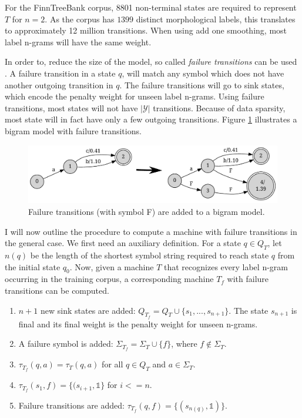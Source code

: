 For the FinnTreeBank corpus, 8801 non-terminal states are required to
represent $T$ for $n=2$. As the corpus has $1399$ distinct
morphological labels, this translates to approximately 12 million
transitions. When using add one smoothing, most label n-grams will
have the same weight.

In order to, reduce the size of the model, so called {\it failure
  transitions} can be used \citep{someone}. A failure transition in a
state $q$, will match any symbol which does not have another outgoing
transition in $q$. The failure transitions will go to sink states,
which encode the penalty weight for unseen label n-grams.  Using
failure transitions, most states will not have $|\mathcal{Y}|$
transitions. Because of data sparsity, most state will in fact have
only a few outgoing transitions. Figure \ref{fig:fail_t} illustrates a
bigram model with failure transitions.

\begin{figure}
\begin{center}
\includegraphics[scale=0.5]{fail_t}
\caption{Failure transitions (with symbol F) are added to a bigram model.}\label{fig:fail_t}
\end{center}
\end{figure}

I will now outline the procedure to compute a machine with failure
transitions in the general case. We first need an auxiliary
definition. For a state $q \in Q_T$, let $n(q)$ be the length of the
shortest symbol string required to reach state $q$ from the initial
state $q_0$.  Now, given a machine $T$ that recognizes every label
n-gram occurring in the training corpus, a corresponding machine $T_f$
with failure transitions can be computed.

\begin{enumerate}
\item $n+1$ new sink states are added: $Q_{T_f} = Q_T \cup \{s_1, ...,
  s_{n+1}\}$. The state $s_{n+1}$ is final and its final weight is the
  penalty weight for unseen n-grams.
\item A failure symbol is added: $\Sigma_{T_f} = \Sigma_T \cup \{f\}$, where $f \notin \Sigma_T$.
\item $\tau_{T_f}(q,a) = \tau_T(q,a)$ for all $q \in Q_T$ and $a \in \Sigma_T$. 
\item $\tau_{T_f}(s_1,f) = \{(s_{i+1}, \mathbb{1}\}$ for $i <= n$.
\item Failure transitions are added: $\tau_{T_f}(q, f) = \{(s_{n(q)}, \mathbb{1})\}$.
\end{enumerate}

